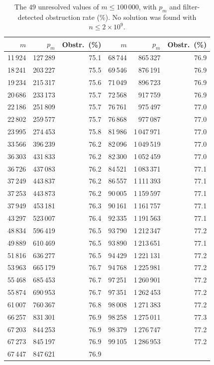 \documentclass[12pt]{article}
\begin{document}
\begin{table}[ht]
	\centering
	\caption{The $49$ unresolved values of $m \leq 100\,000$, with $p_m$
		and filter-detected obstruction rate (\%).
		No solution was found with $n \leq 2 \times 10^9$.}
	\label{tab:notfound}
	\small
	\begin{tabular}{rrr@{\qquad}rrr}
		\toprule
		$m$ & $p_m$ & Obstr.\ (\%) & $m$ & $p_m$ & Obstr.\ (\%) \\
		\midrule
		11\,924 &  127\,289 & 75.1 & 68\,744 &  865\,327 & 76.9 \\
		18\,241 &  203\,227 & 75.5 & 69\,546 &  876\,191 & 76.9 \\
		19\,234 &  215\,317 & 75.6 & 71\,049 &  896\,723 & 76.9 \\
		20\,686 &  233\,173 & 75.7 & 72\,568 &  917\,759 & 76.9 \\
		22\,186 &  251\,809 & 75.7 & 76\,761 &  975\,497 & 77.0 \\
		22\,802 &  259\,577 & 75.7 & 76\,868 &  977\,087 & 77.0 \\
		23\,995 &  274\,453 & 75.8 & 81\,986 & 1\,047\,971 & 77.0 \\
		33\,566 &  396\,239 & 76.2 & 82\,096 & 1\,049\,519 & 77.0 \\
		36\,303 &  431\,833 & 76.2 & 82\,300 & 1\,052\,459 & 77.0 \\
		36\,726 &  437\,083 & 76.2 & 84\,521 & 1\,083\,371 & 77.1 \\
		37\,249 &  443\,837 & 76.2 & 86\,557 & 1\,111\,393 & 77.1 \\
		37\,253 &  443\,873 & 76.2 & 90\,005 & 1\,159\,597 & 77.1 \\
		37\,949 &  453\,181 & 76.3 & 90\,161 & 1\,161\,757 & 77.1 \\
		43\,297 &  523\,007 & 76.4 & 92\,335 & 1\,191\,563 & 77.1 \\
		48\,834 &  596\,419 & 76.5 & 93\,790 & 1\,212\,347 & 77.2 \\
		49\,889 &  610\,469 & 76.5 & 93\,890 & 1\,213\,651 & 77.1 \\
		51\,816 &  636\,277 & 76.5 & 94\,429 & 1\,221\,131 & 77.2 \\
		53\,963 &  665\,179 & 76.7 & 94\,768 & 1\,225\,981 & 77.2 \\
		55\,468 &  685\,453 & 76.7 & 97\,251 & 1\,260\,901 & 77.2 \\
		55\,874 &  690\,953 & 76.7 & 97\,351 & 1\,262\,453 & 77.2 \\
		61\,007 &  760\,367 & 76.8 & 98\,008 & 1\,271\,383 & 77.2 \\
		66\,257 &  831\,301 & 76.9 & 98\,258 & 1\,275\,011 & 77.3 \\
		67\,203 &  844\,253 & 76.9 & 98\,379 & 1\,276\,747 & 77.2 \\
		67\,273 &  845\,197 & 76.9 & 99\,105 & 1\,286\,953 & 77.2 \\
		67\,447 &  847\,621 & 76.9 &       &         &      \\
		\bottomrule
	\end{tabular}
\end{table}
\end{document}

